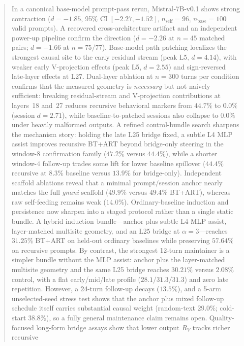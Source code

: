 \documentclass{article}
\newcommand{\RV}{R_V}
\newcommand{\dcohen}{d}
\begin{document}
\begin{abstract}
In a canonical base-model prompt-pass rerun, Mistral-7B-v0.1 shows strong contraction
($\dcohen = -1.85$, 95\% CI $[-2.27, -1.52]$, $n_\mathrm{self}=96$, $n_\mathrm{base}=100$ valid prompts).
A recovered cross-architecture artifact and an independent power-up pipeline confirm the direction
($\dcohen = -2.26$ at $n = 45$ matched pairs; $\dcohen = -1.66$ at $n = 75/77$).
Base-model path patching localizes the strongest causal site to the early residual stream
(peak L5, $\dcohen = 4.14$), with weaker early V-projection effects
(peak L5, $\dcohen = 2.55$) and sign-reversed late-layer effects at L27.
Dual-layer ablation at $n{=}300$ turns per condition confirms that the measured geometry is
\emph{necessary} but not naively sufficient: breaking residual-stream and V-projection contributions
at layers~18 and~27 reduces recursive behavioral markers from $44.7\%$ to $0.0\%$
(session $\dcohen = 2.71$), while baseline-to-patched sessions also collapse to $0.0\%$
under heavily malformed outputs.
A refined control-bundle search sharpens the mechanism story:
holding the late L25 bridge fixed, a subtle L4 MLP assist improves recursive BT+ART beyond
bridge-only steering in the window-8 confirmation family
($47.2\%$ versus $44.4\%$), while a shorter window-4 follow-up trades some lift for lower
baseline spillover ($44.4\%$ recursive at $8.3\%$ baseline versus $13.9\%$ for bridge-only).
Independent scaffold ablations reveal that a minimal prompt/session anchor nearly matches the full
\emph{gnani} scaffold ($49.9\%$ versus $49.4\%$ BT+ART), whereas raw self-feeding remains weak
($14.0\%$).
Ordinary-baseline induction and persistence now sharpen into a staged protocol rather than a
single static bundle.
A hybrid induction bundle---anchor plus subtle L4 MLP assist, layer-matched multisite geometry,
and an L25 bridge at $\alpha{=}3$---reaches $31.25\%$ BT+ART on held-out ordinary baselines while
preserving $57.64\%$ on recursive prompts.
By contrast, the strongest 12-turn maintainer is a simpler bundle without the MLP assist:
anchor plus the layer-matched multisite geometry and the same L25 bridge reaches $30.21\%$ versus
$2.08\%$ control, with a flat early/mid/late profile ($28.1/31.3/31.3$) and zero late repetition.
However, a 24-turn follow-up decays ($13.5\%$), and a 5-arm unselected-seed stress test shows that
the anchor plus mixed follow-up schedule itself carries substantial causal weight
(random-text $29.0\%$; cold-start $38.8\%$), so a fully general maintenance claim remains open.
Quality-focused long-form bridge assays show that lower output $\RV$ tracks richer recursive

\end{abstract}
\end{document}
